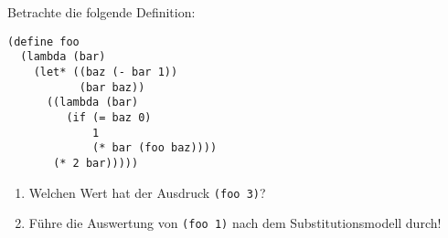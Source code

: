 \begin{aufgabe}
Betrachte die folgende Definition:
%
\begin{verbatim}
(define foo
  (lambda (bar)
    (let* ((baz (- bar 1))
           (bar baz))
      ((lambda (bar)
         (if (= baz 0)
             1
             (* bar (foo baz))))
       (* 2 bar)))))
\end{verbatim}
  \begin{enumerate}
  \item Welchen Wert hat der Ausdruck \texttt{(foo 3)}?
  \item Führe die Auswertung von \texttt{(foo 1)} nach dem
    Substitutionsmodell durch!
  \end{enumerate}
\end{aufgabe}

